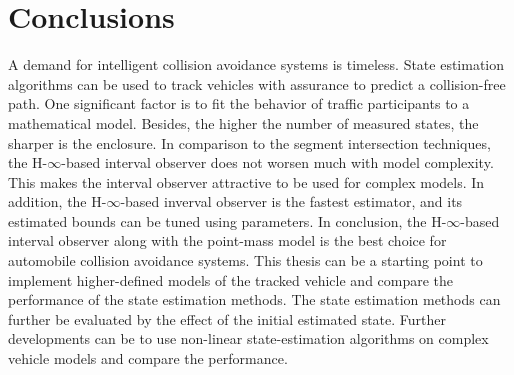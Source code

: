 \chapter{Conclusions} \label{ch:conclusion}
A demand for intelligent collision avoidance systems is timeless. State estimation algorithms can be used to track vehicles with assurance to predict a collision-free path. One significant factor is to fit the behavior of traffic participants to a mathematical model. Besides, the higher the number of measured states, the sharper is the enclosure. In comparison to the segment intersection techniques, the H-$\infty$-based interval observer does not worsen much with model complexity. This makes the interval observer attractive to be used for complex models. In addition, the H-$\infty$-based inverval observer is the fastest estimator, and its estimated bounds can be tuned using parameters. In conclusion, the H-$\infty$-based interval observer along with the point-mass model is the best choice for automobile collision avoidance systems. This thesis can be a starting point to implement higher-defined models of the tracked vehicle and compare the performance of the state estimation methods. The state estimation methods can further be evaluated by the effect of the initial estimated state. Further developments can be to use non-linear state-estimation algorithms on complex vehicle models and compare the performance.